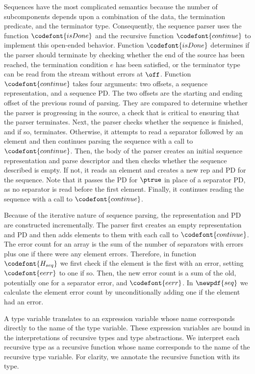 Sequences have the most complicated semantics because the number of
subcomponents depends upon a combination of the data, the termination
predicate, and the terminator type. Consequently, the sequence parser
uses the function $\codefont{isDone}$ and the recursive function
$\codefont{continue}$ to implement this open-ended behavior.
Function $\codefont{isDone}$ determines if the parser should terminate
by checking whether the end of the source has been reached, the
termination condition $e$ has been satisfied, or the terminator type
can be read from the stream without errors at $\off$.  Function
$\codefont{continue}$ takes four arguments: two offsets, a sequence
representation, and a sequence PD.  The two offsets are the starting
and ending offset of the previous round of parsing. They are compared
to determine whether the parser is progressing in the source, a check
that is critical to ensuring that the parser terminates. Next, the
parser checks whether the sequence is finished, and if so, terminates.
Otherwise, it attempts to read a separator followed by an element and
then continues parsing the sequence with a call to
$\codefont{continue}$.  Then, the body of the parser creates an
initial sequence representation and parse descriptor and then checks
whether the sequence described is empty. If not, it reads an element
and creates a new rep and PD for the sequence.  Note that it passes
the PD for $\ptrue$ in place of a separator PD, as no separator is
read before the first element.  Finally, it continues reading the
sequence with a call to $\codefont{continue}$.

Because of the iterative nature of sequence parsing, the
representation and PD are constructed incrementally. The parser first
creates an empty representation and PD and then adds elements to them
with each call to $\codefont{continue}$. The error count for an array
is the sum of the number of separators with errors plus one if there
were any element errors. Therefore, in function ${\codefont{H_{seq}}}$
we first check if the element is the first with an error, setting
$\codefont{eerr}$ to one if so. Then, the new error count is a sum of
the old, potentially one for a separator error, and $\codefont{eerr}$.
In $\newpdf{seq}$ we calculate the element error count by
unconditionally adding one if the element had an error.

A type variable translates to an expression variable whose name
corresponds directly to the name of the type variable. These
expression variables are bound in the interpretations of recursive
types and type abstractions. We interpret each recursive type as a
recursive function whose name corresponds to the name of the recursive
type variable. For clarity, we annotate the recursive function with its
type.

